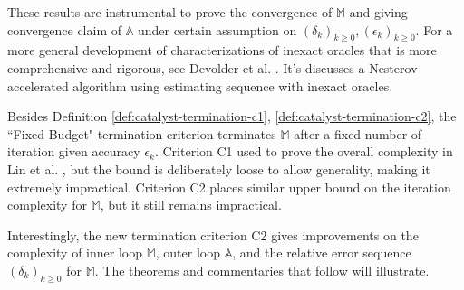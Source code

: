 \documentclass[12pt]{article}
\begin{document}
            These results are instrumental to prove the convergence of $\mathbb M$ and giving convergence claim of $\mathbb A$ under certain assumption on $(\delta_k)_{k \ge 0}, (\epsilon_k)_{k \ge0}$. 
            For a more general development of characterizations of inexact oracles that is more comprehensive and rigorous, see Devolder et al. \cite{devolder_first-order_2014}. 
            It's discusses a Nesterov accelerated algorithm using estimating sequence with inexact oracles. 
            \par
            Besides Definition \ref{def:catalyst-termination-c1}, \ref{def:catalyst-termination-c2}, the ``Fixed Budget" termination criterion terminates $\mathbb M$ after a fixed number of iteration given accuracy $\epsilon_k$. 
            Criterion C1 used to prove the overall complexity in Lin et al. \cite{lin_universal_2015}, but the bound is deliberately loose to allow generality, making it extremely impractical. 
            Criterion C2 places similar upper bound on the iteration complexity for $\mathbb M$, but it still remains impractical. 
            \par
            Interestingly, the new termination criterion C2 gives improvements on the complexity of inner loop $\mathbb M$, outer loop $\mathbb A$, and the relative error sequence $(\delta_k)_{k \ge0}$ for $\mathbb M$. 
            The theorems and commentaries that follow will illustrate. 
\end{document}
